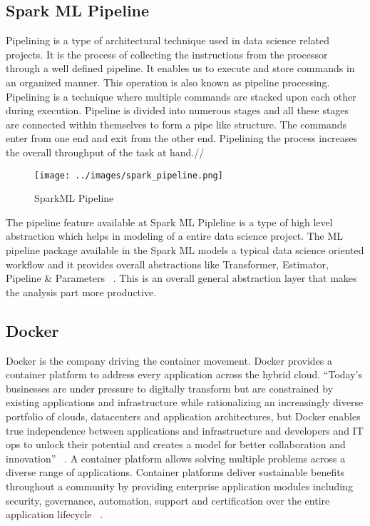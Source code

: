 \begin{enumerate}
\subsection{Spark ML Pipeline}
Pipelining is a type of architectural technique used in data science related projects. 
It is the process of collecting the instructions from the processor through a well defined 
pipeline. It enables us to execute and store commands in an organized manner. This operation is also known as 
pipeline processing. Pipelining is a technique where multiple commands are 
stacked upon each other during execution. Pipeline is divided into numerous stages and all these stages 
are connected within themselves to form a pipe like structure. The commands enter 
from one end and exit from the other end. Pipelining the process increases the overall throughput of the task at hand.//

\begin{figure}[!ht]
\centering\texttt{[image: ../images/spark\_pipeline.png]}
\caption{SparkML Pipeline~\cite{hid-sp18-418-spark-pipeline}}
\label{f:Pipeline in SparkML}
\end{figure}

The pipeline feature available at Spark ML Pipleline is a type of high level abstraction which helps 
in modeling of a entire data science project. The ML pipeline package available in the Spark ML models a 
typical data science oriented workflow and it provides overall abstractions like Transformer, Estimator, 
Pipeline & Parameters ~\cite{hid-sp18-418-spark}. This is an overall general abstraction 
layer that makes the analysis part more productive.

\subsection{Docker}
Docker is the company driving the container movement. Docker provides a container 
platform to address every application across the hybrid cloud. 
``Today’s businesses are under pressure to digitally transform but are constrained 
by existing applications and infrastructure while rationalizing an increasingly 
diverse portfolio of clouds, datacenters and application architectures, but Docker 
enables true independence between applications and infrastructure and developers 
and IT ops to unlock their potential and creates a model for better collaboration 
and innovation'' ~\cite{hid-sp18-418-docker}. A container platform allows solving 
multiple problems across a diverse range of applications. Container platforms deliver sustainable benefits 
throughout a community by providing enterprise application modules including security, governance, 
automation, support and certification over the entire application lifecycle ~\cite{hid-sp18-418-docker}.


\end{enumerate}
